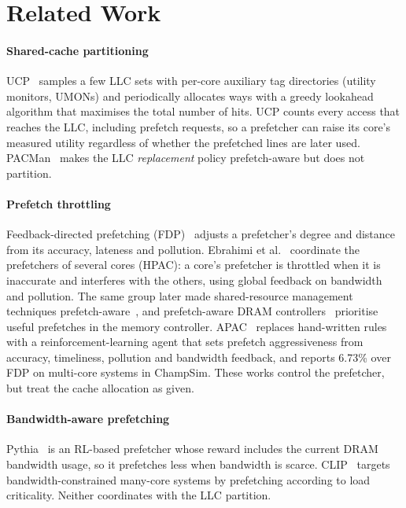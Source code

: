 \section{Related Work}
\label{sec:related}

\paragraph{Shared-cache partitioning}
UCP~\cite{qureshi2006ucp} samples a few LLC sets with per-core auxiliary tag directories (utility monitors, UMONs) and
periodically allocates ways with a greedy lookahead algorithm that maximises the total number of hits.  UCP counts
every access that reaches the LLC, including prefetch requests, so a prefetcher can raise its core's measured utility
regardless of whether the prefetched lines are later used.  PACMan~\cite{wu2011pacman} makes the LLC
\emph{replacement} policy prefetch-aware but does not partition.

\paragraph{Prefetch throttling}
Feedback-directed prefetching (FDP)~\cite{srinath2007fdp} adjusts a prefetcher's degree and distance from its
accuracy, lateness and pollution.  Ebrahimi et al.~\cite{ebrahimi2009hpac} coordinate the prefetchers of several cores
(HPAC): a core's prefetcher is throttled when it is inaccurate and interferes with the others, using global feedback on
bandwidth and pollution.  The same group later made shared-resource management techniques prefetch-aware~\cite{
ebrahimi2011prefetchaware}, and prefetch-aware DRAM controllers~\cite{lee2008padc} prioritise useful prefetches in the
memory controller.  APAC~\cite{yang2025apac} replaces hand-written rules with a reinforcement-learning agent that sets
prefetch aggressiveness from accuracy, timeliness, pollution and bandwidth feedback, and reports 6.73\% over FDP on
multi-core systems in ChampSim.  These works control the prefetcher, but treat the cache allocation as given.

\paragraph{Bandwidth-aware prefetching}
Pythia~\cite{bera2021pythia} is an RL-based prefetcher whose reward includes the current DRAM bandwidth usage, so it
prefetches less when bandwidth is scarce.  CLIP~\cite{panda2023clip} targets bandwidth-constrained many-core systems by prefetching according to load
criticality.  Neither coordinates with the LLC partition.

